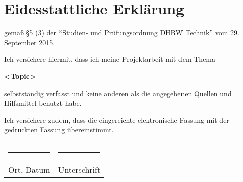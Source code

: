 %
\chapter*{Eidesstattliche Erklärung}
\thispagestyle{empty}
\begin{center}
gemäß \S 5 (3) der "`Studien- und Prüfungsordnung DHBW Technik"' vom 29. September 2015.
\vspace{\baselineskip}

Ich versichere hiermit, dass ich meine Projektarbeit mit dem Thema
\vspace{\baselineskip}

\textbf{<Topic>}

\vspace{\baselineskip}

selbstständig verfasst und keine anderen als die angegebenen Quellen und Hilfsmittel benutzt habe.
\vspace{\baselineskip}

Ich versichere zudem, dass die eingereichte elektronische Fassung mit der gedruckten Fassung übereinstimmt.

\vspace{3cm}

\begin{tabular}{p{7.5cm}p{7.5cm}}
\rule{6cm}{0.4pt} & \rule{6cm}{0.4pt}\\
Ort, Datum & Unterschrift\\

\end{tabular}
\end{center}
%